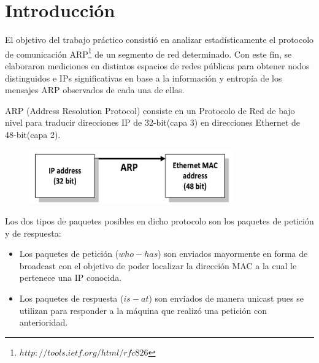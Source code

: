 \documentclass[10pt, a4paper]{article}
\author{Teor\'ia de las Comunicaciones, DC, UBA.}
\date{}
\title{}
\begin{document}
	
\thispagestyle{empty}

\maketitle

\tableofcontents
\newpage

\section{Introducción}
El objetivo del trabajo práctico consistió en analizar estadísticamente el protocolo de comunicación ARP\footnote{$http://tools.ietf.org/html/rfc826$} de un segmento de red determinado. Con este fin, se elaboraron mediciones en distintos espacios de redes públicas para obtener nodos distinguidos e IPs significativas en base a la información y entropía de los mensajes ARP observados de cada una de ellas.

ARP (Address Resolution Protocol) consiste en un Protocolo de Red de bajo nivel para traducir direcciones IP de 32-bit(capa 3) en direcciones Ethernet de 48-bit(capa 2).

\begin{figure}[H] %
\begin{center}
\includegraphics[width=250pt]{../imgs/IPtoMAC.png}
\end{center}
\end{figure}

Los dos tipos de paquetes posibles en dicho protocolo son los paquetes de petición y de respuesta:
\begin{itemize}
\item Los paquetes de petición ($who-has$) son enviados mayormente en forma de broadcast con el objetivo de poder localizar la dirección MAC a la cual le pertenece una IP conocida.
\item Los paquetes de respuesta ($is-at$) son enviados de manera unicast pues se utilizan para responder a la máquina que realizó una petición con anterioridad.
\end{itemize}
\end{document}
